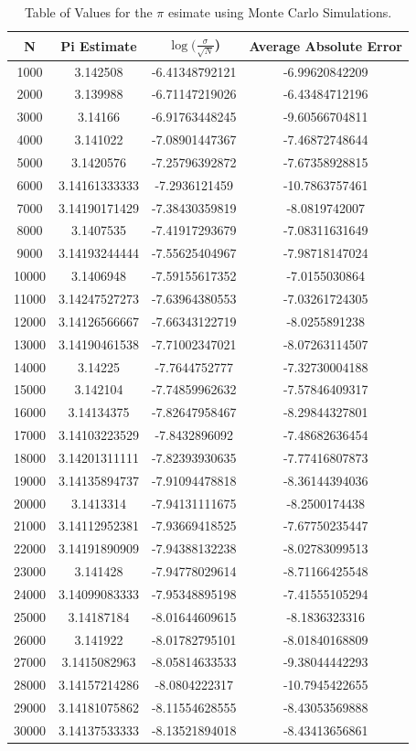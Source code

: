 \documentclass[a4paper,11pt]{article}
\begin{document}
\begin{table}[ht]
\centering
\label{1b}
\begin{tabular}{|c|c|c|c|}
\hline
\textbf{N} & \textbf{Pi Estimate}&\textbf{$\log(\frac{\sigma}{\sqrt{N}}$)}&\textbf{Average Absolute Error} \\ \hline
1000 & 3.142508 & -6.41348792121 & -6.99620842209 \\
2000 & 3.139988 & -6.71147219026 & -6.43484712196 \\
3000 & 3.14166 & -6.91763448245 & -9.60566704811 \\
4000 & 3.141022 & -7.08901447367 & -7.46872748644 \\
5000 & 3.1420576 & -7.25796392872 & -7.67358928815 \\
6000 & 3.14161333333 & -7.2936121459 & -10.7863757461 \\
7000 & 3.14190171429 & -7.38430359819 & -8.0819742007 \\
8000 & 3.1407535 & -7.41917293679 & -7.08311631649 \\
9000 & 3.14193244444 & -7.55625404967 & -7.98718147024 \\
10000 & 3.1406948 & -7.59155617352 & -7.0155030864 \\
11000 & 3.14247527273 & -7.63964380553 & -7.03261724305 \\
12000 & 3.14126566667 & -7.66343122719 & -8.0255891238 \\
13000 & 3.14190461538 & -7.71002347021 & -8.07263114507 \\
14000 & 3.14225 & -7.7644752777 & -7.32730004188 \\
15000 & 3.142104 & -7.74859962632 & -7.57846409317 \\
16000 & 3.14134375 & -7.82647958467 & -8.29844327801 \\
17000 & 3.14103223529 & -7.8432896092 & -7.48682636454 \\
18000 & 3.14201311111 & -7.82393930635 & -7.77416807873 \\
19000 & 3.14135894737 & -7.91094478818 & -8.36144394036 \\
20000 & 3.1413314 & -7.94131111675 & -8.2500174438 \\
21000 & 3.14112952381 & -7.93669418525 & -7.67750235447 \\
22000 & 3.14191890909 & -7.94388132238 & -8.02783099513 \\
23000 & 3.141428 & -7.94778029614 & -8.71166425548 \\
24000 & 3.14099083333 & -7.95348895198 & -7.41555105294 \\
25000 & 3.14187184 & -8.01644609615 & -8.1836323316 \\
26000 & 3.141922 & -8.01782795101 & -8.01840168809 \\
27000 & 3.1415082963 & -8.05814633533 & -9.38044442293 \\
28000 & 3.14157214286 & -8.0804222317 & -10.7945422655 \\
29000 & 3.14181075862 & -8.11554628555 & -8.43053569888 \\
30000 & 3.14137533333 & -8.13521894018 & -8.43413656861 \\
\hline
\end{tabular}
\caption{Table of Values for the $\pi$ esimate using Monte Carlo Simulations.}
\end{table}
\end{document}
